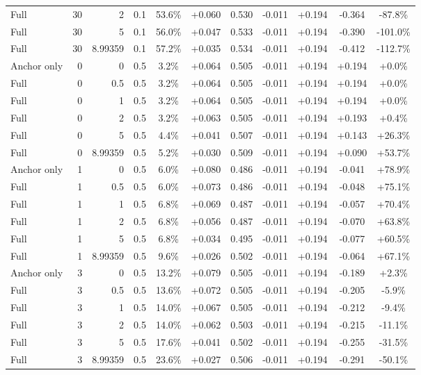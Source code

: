 \begin{table}[htbp]
\begin{tabular}{lrrrccccccc}
Full & 30 & 2 & 0.1 & 53.6\% & +0.060 & 0.530 & -0.011 & +0.194 & -0.364 & -87.8\% \\
Full & 30 & 5 & 0.1 & 56.0\% & +0.047 & 0.533 & -0.011 & +0.194 & -0.390 & -101.0\% \\
Full & 30 & 8.99359 & 0.1 & 57.2\% & +0.035 & 0.534 & -0.011 & +0.194 & -0.412 & -112.7\% \\
Anchor only & 0 & 0 & 0.5 & 3.2\% & +0.064 & 0.505 & -0.011 & +0.194 & +0.194 & +0.0\% \\
Full & 0 & 0.5 & 0.5 & 3.2\% & +0.064 & 0.505 & -0.011 & +0.194 & +0.194 & +0.0\% \\
Full & 0 & 1 & 0.5 & 3.2\% & +0.064 & 0.505 & -0.011 & +0.194 & +0.194 & +0.0\% \\
Full & 0 & 2 & 0.5 & 3.2\% & +0.063 & 0.505 & -0.011 & +0.194 & +0.193 & +0.4\% \\
Full & 0 & 5 & 0.5 & 4.4\% & +0.041 & 0.507 & -0.011 & +0.194 & +0.143 & +26.3\% \\
Full & 0 & 8.99359 & 0.5 & 5.2\% & +0.030 & 0.509 & -0.011 & +0.194 & +0.090 & +53.7\% \\
Anchor only & 1 & 0 & 0.5 & 6.0\% & +0.080 & 0.486 & -0.011 & +0.194 & -0.041 & +78.9\% \\
Full & 1 & 0.5 & 0.5 & 6.0\% & +0.073 & 0.486 & -0.011 & +0.194 & -0.048 & +75.1\% \\
Full & 1 & 1 & 0.5 & 6.8\% & +0.069 & 0.487 & -0.011 & +0.194 & -0.057 & +70.4\% \\
Full & 1 & 2 & 0.5 & 6.8\% & +0.056 & 0.487 & -0.011 & +0.194 & -0.070 & +63.8\% \\
Full & 1 & 5 & 0.5 & 6.8\% & +0.034 & 0.495 & -0.011 & +0.194 & -0.077 & +60.5\% \\
Full & 1 & 8.99359 & 0.5 & 9.6\% & +0.026 & 0.502 & -0.011 & +0.194 & -0.064 & +67.1\% \\
Anchor only & 3 & 0 & 0.5 & 13.2\% & +0.079 & 0.505 & -0.011 & +0.194 & -0.189 & +2.3\% \\
Full & 3 & 0.5 & 0.5 & 13.6\% & +0.072 & 0.505 & -0.011 & +0.194 & -0.205 & -5.9\% \\
Full & 3 & 1 & 0.5 & 14.0\% & +0.067 & 0.505 & -0.011 & +0.194 & -0.212 & -9.4\% \\
Full & 3 & 2 & 0.5 & 14.0\% & +0.062 & 0.503 & -0.011 & +0.194 & -0.215 & -11.1\% \\
Full & 3 & 5 & 0.5 & 17.6\% & +0.041 & 0.502 & -0.011 & +0.194 & -0.255 & -31.5\% \\
Full & 3 & 8.99359 & 0.5 & 23.6\% & +0.027 & 0.506 & -0.011 & +0.194 & -0.291 & -50.1\% \\

\end{tabular}
\end{table}
